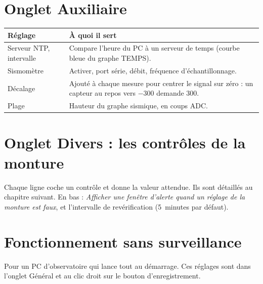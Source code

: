 \needspace{0.6\textheight}
\section{Onglet Auxiliaire}


\begin{center}
\begin{tabularx}{\textwidth}{lX}
\toprule
\textbf{Réglage} & \textbf{À quoi il sert} \\
\midrule
Serveur NTP, intervalle & Compare l'heure du PC à un serveur de temps (courbe
bleue du graphe TEMPS). \\
Sismomètre & Activer, port série, débit, fréquence d'échantillonnage. \\
Décalage & Ajouté à chaque mesure pour centrer le signal sur zéro : un capteur
au repos vers $-300$ demande 300. \\
Plage & Hauteur du graphe sismique, en coups ADC. \\
\bottomrule
\end{tabularx}
\end{center}

\needspace{0.6\textheight}
\section{Onglet Divers : les contrôles de la monture}


Chaque ligne coche un contrôle et donne la valeur attendue. Ils sont détaillés
au chapitre suivant. En bas : \emph{Afficher une fenêtre d'alerte quand un
réglage de la monture est faux}, et l'intervalle de revérification (5~minutes
par défaut).

\section{Fonctionnement sans surveillance}
\label{sec:unattended}

Pour un PC d'observatoire qui lance tout au démarrage. Ces réglages sont dans
l'onglet Général et au clic droit sur le bouton d'enregistrement.

